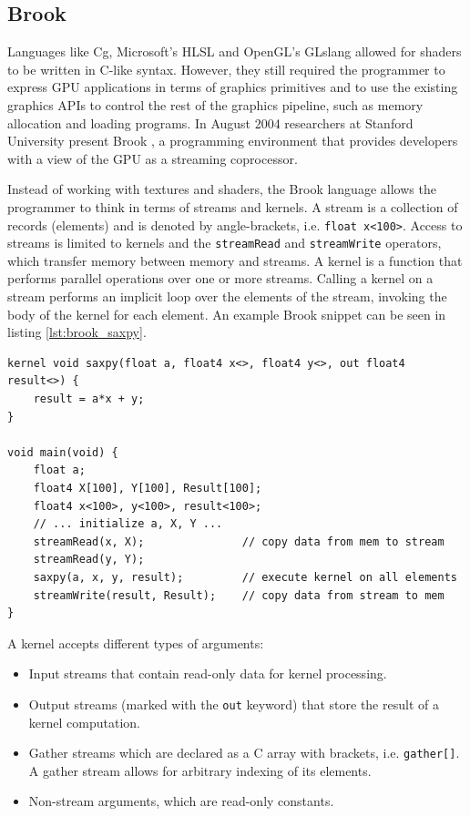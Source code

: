 \subsection{Brook}
Languages like Cg, Microsoft's HLSL and OpenGL's GLslang allowed for shaders to be written in C-like syntax. However, they still required the programmer to express GPU applications in terms of graphics primitives and to use the existing graphics APIs to control the rest of the graphics pipeline, such as memory allocation and loading programs. In August 2004 researchers at Stanford University present Brook \cite{brook}, a programming environment that provides developers with a view of the GPU as a streaming coprocessor.

Instead of working with textures and shaders, the Brook language allows the programmer to think in terms of streams and kernels. A stream is a collection of records (elements) and is denoted by angle-brackets, i.e. \texttt{float x<100>}. Access to streams is limited to kernels and the \texttt{streamRead} and \texttt{streamWrite} operators, which transfer memory between memory and streams. A kernel is a function that performs parallel operations over one or more streams. Calling a kernel on a stream performs an implicit loop over the elements of the stream, invoking the body of the kernel for each element. An example Brook snippet can be seen in listing \ref{lst:brook_saxpy}.

\begin{lstlisting}[style=BrookStyle, caption=Brook saxpy example, float, floatplacement=H, label={lst:brook_saxpy}]
kernel void saxpy(float a, float4 x<>, float4 y<>, out float4 result<>) {
    result = a*x + y;
}

void main(void) {
    float a;
    float4 X[100], Y[100], Result[100];
    float4 x<100>, y<100>, result<100>;
    // ... initialize a, X, Y ...
    streamRead(x, X);               // copy data from mem to stream
    streamRead(y, Y);
    saxpy(a, x, y, result);         // execute kernel on all elements
    streamWrite(result, Result);    // copy data from stream to mem
}   
\end{lstlisting}

A kernel accepts different types of arguments:

\begin{itemize}
    \item Input streams that contain read-only data for kernel processing.
    \item Output streams (marked with the \texttt{out} keyword) that store the result of a kernel computation.
    \item Gather streams which are declared as a C array with brackets, i.e. \texttt{gather[]}. A gather stream allows for arbitrary indexing of its elements.
    \item Non-stream arguments, which are read-only constants.
\end{itemize}

